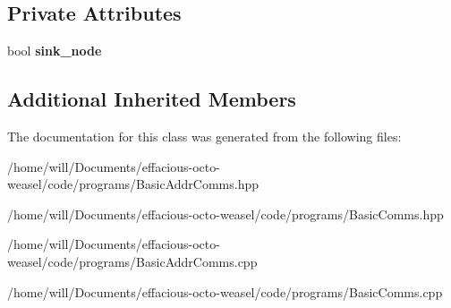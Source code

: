 \subsection*{Private Attributes}
\begin{DoxyCompactItemize}
\item 
bool {\bfseries sink\+\_\+node}\hypertarget{class_test_a879d89424f2c08816d21001964c62c75}{}\label{class_test_a879d89424f2c08816d21001964c62c75}

\end{DoxyCompactItemize}
\subsection*{Additional Inherited Members}


The documentation for this class was generated from the following files\+:\begin{DoxyCompactItemize}
\item 
/home/will/\+Documents/effacious-\/octo-\/weasel/code/programs/Basic\+Addr\+Comms.\+hpp\item 
/home/will/\+Documents/effacious-\/octo-\/weasel/code/programs/Basic\+Comms.\+hpp\item 
/home/will/\+Documents/effacious-\/octo-\/weasel/code/programs/Basic\+Addr\+Comms.\+cpp\item 
/home/will/\+Documents/effacious-\/octo-\/weasel/code/programs/Basic\+Comms.\+cpp\end{DoxyCompactItemize}
